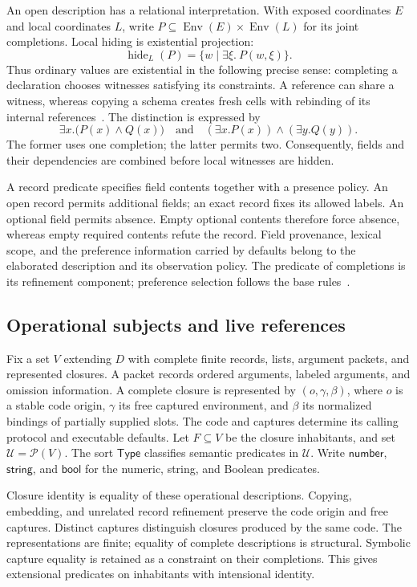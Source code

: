 \documentclass[10pt,a4paper]{article}
\newcommand{\Pow}{\mathcal P}
\newcommand{\U}{\mathcal U}
\newcommand{\Env}{\operatorname{Env}}
\newcommand{\Type}{\mathsf{Type}}
\newcommand{\Num}{\mathsf{number}}
\newcommand{\Bool}{\mathsf{bool}}
\newcommand{\Str}{\mathsf{string}}
\theoremstyle{remark}
\begin{document}
An open description has a relational interpretation. With exposed coordinates
$E$ and local coordinates $L$, write
$P\subseteq\Env(E)\times\Env(L)$ for its joint completions. Local hiding is
existential projection:
\[
 \operatorname{hide}_L(P)=\{w\mid\exists\xi.\ P(w,\xi)\}.
\]
Thus ordinary values are existential in the following precise sense: completing
a declaration chooses witnesses satisfying its constraints. A reference can
share a witness, whereas copying a schema creates fresh cells with rebinding of
its internal references~\cite{cuerefs}. The distinction is expressed by
\[
 \exists x.\bigl(P(x)\land Q(x)\bigr)
 \quad\text{and}\quad
 (\exists x.P(x))\land(\exists y.Q(y)).
\]
The former uses one completion; the latter permits two. Consequently, fields
and their dependencies are combined before local witnesses are hidden.

A record predicate specifies field contents together with a presence policy.
An open record permits additional fields; an exact record fixes its allowed
labels. An optional field permits absence. Empty optional contents therefore
force absence, whereas empty required contents refute the record. Field
provenance, lexical scope, and the preference information carried by defaults
belong to the elaborated description and its observation policy. The predicate
of completions is its refinement component; preference selection follows the
base rules~\cite{cuedefaults}.

\subsection{Operational subjects and live references}
Fix a set $V$ extending $D$ with complete finite records, lists, argument
packets, and represented closures. A packet records ordered arguments, labeled
arguments, and omission information. A complete closure is represented by
$(o,\gamma,\beta)$, where $o$ is a stable code origin, $\gamma$ its free captured
environment, and $\beta$ its normalized bindings of partially supplied slots.
The code and captures determine its calling protocol and executable defaults.
Let $F\subseteq V$ be the closure inhabitants, and set $\U=\Pow(V)$.
The sort $\Type$ classifies semantic predicates in $\U$.
Write $\Num$, $\Str$, and $\Bool$ for the numeric, string, and Boolean
predicates.

Closure identity is equality of these operational descriptions. Copying,
embedding, and unrelated record refinement preserve the code origin and free
captures. Distinct captures distinguish closures produced by the same code.
The representations are finite; equality of complete descriptions is
structural. Symbolic capture equality is retained as a constraint on their
completions. This gives extensional predicates on inhabitants with intensional
identity.
\end{document}
